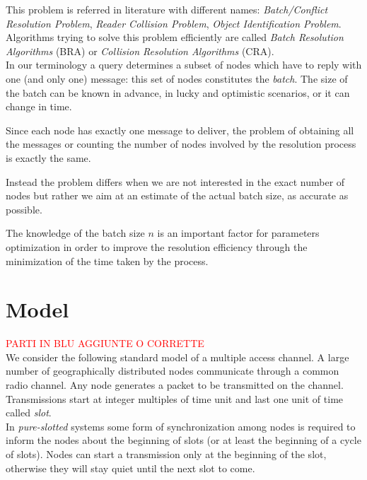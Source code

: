 \documentclass[11pt,a4paper,twoside,openright]{book}
\newcommand{\rev}[1]{\textcolor{Cerulean}{#1}}
\begin{document}
This problem is referred in literature with different names: \emph{Batch/Conflict Resolution Problem}, \emph{Reader Collision Problem}, \emph{Object Identification Problem}.\\
Algorithms trying to solve this problem efficiently  are called \emph{Batch Resolution Algorithms} (BRA) or  \emph{Collision Resolution Algorithms} (CRA).\\ 

In our terminology a query determines a subset of nodes which have to reply with one (and only one) message: this set of nodes constitutes the \emph{batch}. The size of the batch can be known in advance, in lucky and optimistic scenarios, or \rev{it} can change in time.

Since each node has exactly one message to deliver, the problem of obtaining all the messages or counting the number of nodes involved by the resolution process is exactly the same.

\rev{
Instead the problem differs when we are not interested in the exact number of nodes but rather we aim at an estimate of the actual batch size, as accurate as possible.}

\rev{
The knowledge of the batch size $n$ is an important factor for parameters optimization in order to improve the resolution efficiency  through the minimization of the time taken by the process.\\}

\section{Model}
\label{se:model}
\textcolor{red}{PARTI IN BLU AGGIUNTE O CORRETTE}\\

We consider the following standard model of a multiple access channel. A large number of geographically distributed nodes communicate through a common radio channel. Any node generates a packet to be transmitted on the channel. Transmissions start at integer multiples of  time unit and last one unit of time called \emph{slot}.\\

\rev{
In \emph{pure-slotted} systems some form of synchronization among nodes is required to inform the nodes about the beginning of slots (or at least the beginning of a cycle of slots). Nodes can start a transmission only at the beginning of the slot, otherwise they will stay quiet until the next slot to come.\\}
\end{document}
